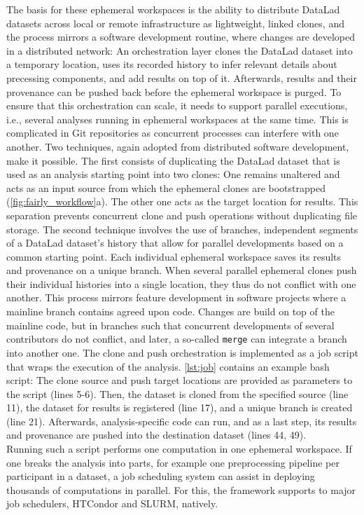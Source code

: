 The basis for these ephemeral workspaces is the ability to distribute DataLad datasets across local or remote infrastructure as lightweight, linked clones, and the process mirrors a software development routine, where changes are developed in a distributed network:
An orchestration layer clones the DataLad dataset into a temporary location, uses its recorded history to infer relevant details about precessing components, and add results on top of it.
Afterwards, results and their provenance can be pushed back before the ephemeral workspace is purged.
To ensure that this orchestration can scale, it needs to support parallel executions, i.e., several analyses running in ephemeral workspaces at the same time.
This is complicated in Git repositories as concurrent processes can interfere with one another.
Two techniques, again adopted from distributed software development, make it possible.
The first consists of duplicating the DataLad dataset that is used as an analysis starting point into two clones: One remains unaltered and acts as an input source from which the ephemeral clones are bootstrapped (\cref{fig:fairly_workflow}a).
The other one acts as the target location for results.
This separation prevents concurrent clone and push operations without duplicating file storage.
The second technique involves the use of branches, independent segments of a DataLad dataset's history that allow for parallel developments based on a common starting point.
Each individual ephemeral workspace saves its results and provenance on a unique branch.
When several parallel ephemeral clones push their individual histories into a single location, they thus do not conflict with one another.
This process mirrors feature development in software projects where a mainline branch contains agreed upon code.
Changes are build on top of the mainline code, but in branches such that concurrent developments of several contributors do not conflict, and later, a so-called \texttt{merge} can integrate a branch into another one.
The clone and push orchestration is implemented as a job script that wraps the execution of the analysis.
\cref{lst:job} contains an example bash script:
The clone source and push target locations are provided as parameters to the script (lines 5-6).
Then, the dataset is cloned from the specified source (line 11), the dataset for results is registered (line 17), and a unique branch is created (line 21).
Afterwards, analysis-specific code can run, and as a last step, its results and provenance are pushed into the destination dataset (lines 44, 49).\\
Running such a script performs one computation in one ephemeral workspace.
If one breaks the analysis into parts, for example one preprocessing pipeline per participant in a dataset, a job scheduling system can assist in deploying thousands of computations in parallel.
For this, the framework supports to major job schedulers, HTCondor and SLURM, natively.


